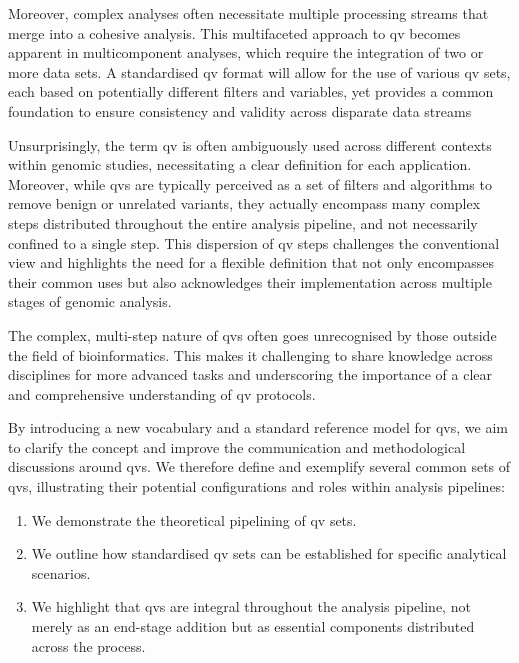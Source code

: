 Moreover, complex analyses often necessitate multiple processing streams that merge into a cohesive analysis. 
This multifaceted approach to \ac{qv} becomes apparent in multicomponent analyses, which require the integration of two or more data sets. 
A standardised \ac{qv} format will allow for the use of various \ac{qv} sets, each based on potentially different filters and variables, yet provides a common foundation to ensure consistency and validity across disparate data streams

Unsurprisingly, the term \ac{qv} is often ambiguously used across different contexts within genomic studies, necessitating a clear definition for each application. 
Moreover, while \ac{qv}s are typically perceived as a set of filters and algorithms to remove benign or unrelated variants, they actually encompass many complex steps distributed throughout the entire analysis pipeline, and not necessarily confined to a single step. 
This dispersion of \ac{qv} steps challenges the conventional view and highlights the need for a flexible definition that not only encompasses their common uses but also acknowledges their implementation across multiple stages of genomic analysis.

The complex, multi-step nature of \ac{qv}s often goes unrecognised by those outside the field of bioinformatics.
This makes it challenging to share knowledge across disciplines for more advanced tasks and underscoring the importance of a clear and comprehensive understanding of \ac{qv} protocols.

By introducing a new vocabulary and a standard reference model for \ac{qv}s, we aim to clarify the concept and improve the communication and methodological discussions around \ac{qv}s. 
We therefore define and exemplify several common sets of \ac{qv}s, illustrating their potential configurations and roles within analysis pipelines:

\begin{enumerate}
    \item We demonstrate the theoretical pipelining of \ac{qv} sets.
    \item We outline how standardised \ac{qv} sets can be established for specific analytical scenarios.
    \item We highlight that \ac{qv}s are integral throughout the analysis pipeline, not merely as an end-stage addition but as essential components distributed across the process.
\end{enumerate}

